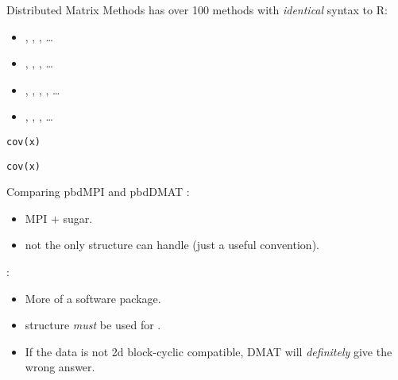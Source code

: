 \begin{frame}[fragile]
  \begin{block}{Distributed Matrix Methods}\pause
     has over 100 methods with \emph{identical} syntax to R:
    \begin{itemize}
     \item \code{\`{}[\`{}}, , , \dots
     \item {}, , , \dots
     \item \code{\`{}\%*\%\`{}}, , , , \dots
     \item {}, , , \dots
    \end{itemize}
\begin{lstlisting}[title=Serial Code]
cov(x)
\end{lstlisting}
  
\begin{lstlisting}[title=Parallel Code]
cov(x)
\end{lstlisting}
  \end{block}
\end{frame}

\begin{frame}[fragile]
  \begin{block}{Comparing pbdMPI and pbdDMAT}\pause
{}:
  \begin{itemize}
     \item MPI $+$ sugar.
     \item {} not the only structure  can handle (just a useful convention).
     \end{itemize}
     
     :
     \begin{itemize}
     \item More of a software package.
     \item {} structure \emph{must} be used for .
     \item If the data is not 2d block-cyclic compatible, DMAT will \emph{definitely} give the 
wrong 
answer.
    \end{itemize}
  \end{block}
\end{frame}

